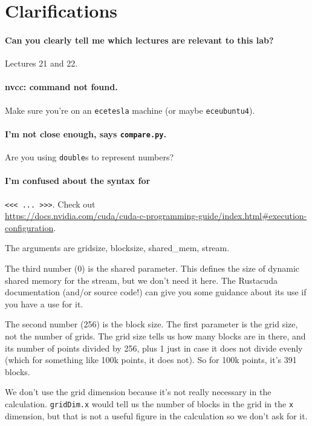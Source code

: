 \section*{Clarifications}

\paragraph{Can you clearly tell me which lectures are relevant to this lab?} Lectures 21 and 22.

\paragraph{nvcc: command not found.} Make sure you're on an \texttt{ecetesla} machine (or maybe \texttt{eceubuntu4}).

\paragraph{I'm not close enough, says \texttt{compare.py}.} Are you using \texttt{double}s to represent numbers?

\paragraph{I'm confused about the syntax for}\verb+<<< ... >>>+. Check out\\
\url{https://docs.nvidia.com/cuda/cuda-c-programming-guide/index.html#execution-configuration}.

The arguments are gridsize, blocksize, shared\_mem, stream.

The third number (0) is the shared parameter. This defines the size of dynamic shared memory for the stream, but we don’t need it here. The Rustacuda documentation (and/or source code!) can give you some guidance about its use if you have a use for it.

The second number (256) is the block size. The first parameter is the grid size, not the number of grids. The grid size tells us how many blocks are in there, and its number of points divided by 256, plus 1 just in case it does not divide evenly (which for something like 100k points, it does not). So for 100k points, it’s 391 blocks.

We don't use the grid dimension because it's not really necessary in the calculation. \texttt{gridDim.x} would tell us the number of blocks in the grid in the \texttt{x} dimension, but that is not a useful figure in the calculation so we don't ask for it.

